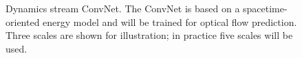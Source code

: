 \begin{figure}[t]
\begin{center}
\end{center}
\vspace{-0.45cm}
\caption[Dynamics stream ConvNet.]{Dynamics stream ConvNet. The ConvNet is based on a
spacetime-oriented energy model
\cite{derpanis2012spacetime, simoncelli1998} and will be trained
for optical flow prediction.
Three scales are shown for illustration;
in practice five scales will be used.}
\label{fig:MSOE}
\end{figure}